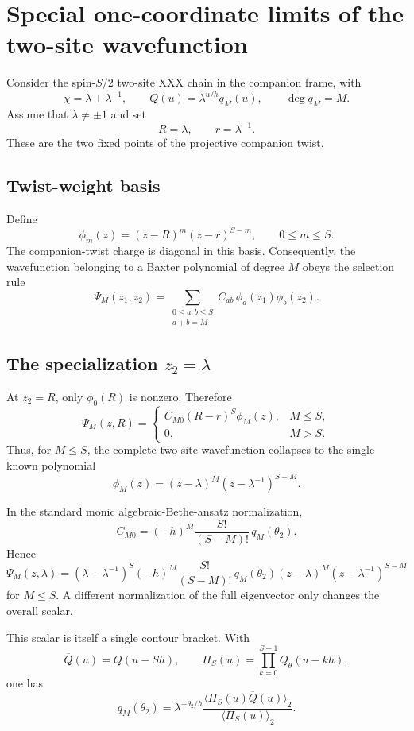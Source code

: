 \documentclass[11pt]{article}
\newcommand{\Qbar}{\overline Q}
\begin{document}
\section*{Special one-coordinate limits of the two-site wavefunction}

Consider the spin-$S/2$ two-site XXX chain in the companion frame,
with
\[
\chi=\lambda+\lambda^{-1},
\qquad
Q(u)=\lambda^{u/h}q_M(u),
\qquad
\deg q_M=M.
\]
Assume that $\lambda\neq\pm1$ and set
\[
R=\lambda,
\qquad
r=\lambda^{-1}.
\]
These are the two fixed points of the projective companion twist.

\subsection*{Twist-weight basis}

Define
\[
\phi_m(z)=(z-R)^m(z-r)^{S-m},
\qquad 0\leq m\leq S.
\]
The companion-twist charge is diagonal in this basis.  Consequently,
the wavefunction belonging to a Baxter polynomial of degree $M$ obeys
the selection rule
\[
\Psi_M(z_1,z_2)
=
\sum_{\substack{0\leq a,b\leq S\\a+b=M}}
C_{ab}\,\phi_a(z_1)\phi_b(z_2).
\]

\subsection*{The specialization $z_2=\lambda$}

At $z_2=R$, only $\phi_0(R)$ is nonzero.  Therefore
\[
\boxed{
\Psi_M(z,R)
=
\begin{cases}
C_{M0}(R-r)^S\phi_M(z),&M\leq S,\\[2mm]
0,&M>S.
\end{cases}}
\]
Thus, for $M\leq S$, the complete two-site wavefunction collapses to
the single known polynomial
\[
\phi_M(z)=(z-\lambda)^M(z-\lambda^{-1})^{S-M}.
\]

In the standard monic algebraic-Bethe-ansatz normalization,
\[
C_{M0}
=
(-h)^M\frac{S!}{(S-M)!}\,q_M(\theta_2).
\]
Hence
\[
\boxed{
\Psi_M(z,\lambda)
=
(\lambda-\lambda^{-1})^S
(-h)^M\frac{S!}{(S-M)!}\,
q_M(\theta_2)
(z-\lambda)^M(z-\lambda^{-1})^{S-M}}
\]
for $M\leq S$.  A different normalization of the full eigenvector
only changes the overall scalar.

This scalar is itself a single contour bracket.  With
\[
\Qbar(u)=Q(u-Sh),
\qquad
\Pi_S(u)=\prod_{k=0}^{S-1}Q_\theta(u-kh),
\]
one has
\[
q_M(\theta_2)
=
\lambda^{-\theta_2/h}
\frac{\langle\Pi_S(u)\Qbar(u)\rangle_2}
     {\langle\Pi_S(u)\rangle_2}.
\]
\end{document}
